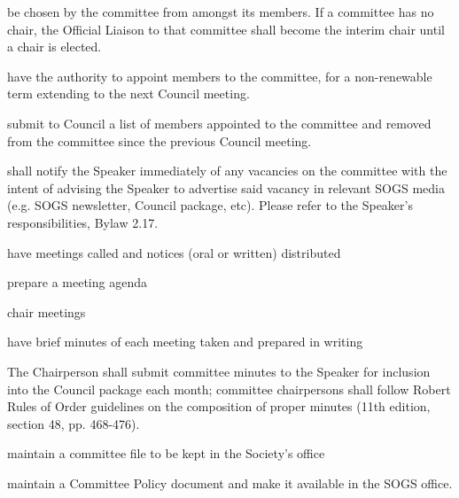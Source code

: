 \begin{longenum}[ label*=\thesubsection.\arabic*., align=left]
	\item be chosen by the committee from amongst its members. If a committee has no chair, the Official Liaison to that committee shall become the interim chair until a chair is elected.
    \item have the authority to appoint members to the committee, for a non-renewable term extending to the next Council meeting. 
    \item submit to Council a list of members appointed to the committee and removed from the committee since the previous Council meeting.
    \item shall notify the Speaker immediately of any vacancies on the committee with the intent of advising the Speaker to advertise said vacancy in relevant SOGS media (e.g. SOGS newsletter, Council package, etc). Please refer to the Speaker's responsibilities, Bylaw 2.17.
    \item have meetings called and notices (oral or written) distributed
    \item prepare a meeting agenda
    \item chair meetings
    \item have brief minutes of each meeting taken and prepared in writing
    \begin{longenum}[ label*=\arabic*., align=left]
		\item The Chairperson shall submit committee minutes to the Speaker for inclusion into the Council package each month; committee chairpersons shall follow Robert Rules of Order guidelines on the composition of proper minutes (11th edition, section 48, pp. 468-476).
	\end{longenum}
    \item maintain a committee file to be kept in the Society's office
    \item maintain a Committee Policy document and make it available in the SOGS office.

\end{longenum}
